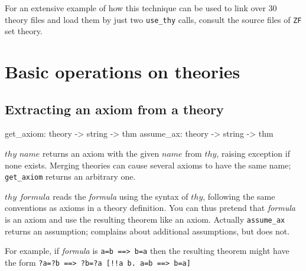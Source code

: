 For an extensive example of how this technique can be used to link over 30
theory files and load them by just two {\tt use_thy} calls, consult the 
source files of {\tt ZF} set theory.



\section{Basic operations on theories}
\subsection{Extracting an axiom from a theory}
\begin{ttbox} 
get_axiom: theory -> string -> thm
assume_ax: theory -> string -> thm
\end{ttbox}
\begin{ttdescription}
\item[\ttindexbold{get_axiom} $thy$ $name$] 
returns an axiom with the given $name$ from $thy$, raising exception
 if none exists.  Merging theories can cause several axioms
to have the same name; {\tt get_axiom} returns an arbitrary one.

\item[\ttindexbold{assume_ax} $thy$ $formula$] 
  reads the {\it formula} using the syntax of $thy$, following the same
  conventions as axioms in a theory definition.  You can thus pretend that
  {\it formula} is an axiom and use the resulting theorem like an axiom.
  Actually {\tt assume_ax} returns an assumption;  
  complains about additional assumptions, but  does not.

For example, if {\it formula} is
\hbox{\tt a=b ==> b=a} then the resulting theorem might have the form
\hbox{\tt\frenchspacing ?a=?b ==> ?b=?a  [!!a b. a=b ==> b=a]}
\end{ttdescription}

